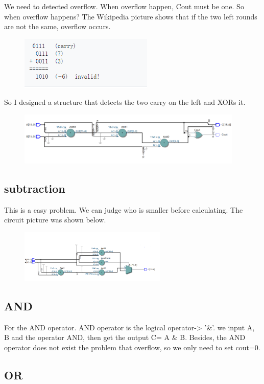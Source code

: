 \documentclass[12pt,a4paper]{article}
\begin{document}
We need to detected overflow.
When overflow happen, Cout must be one.
So when overflow happens?
The Wikipedia picture shows that if the two left rounds are not the same, overflow occurs.
\begin{figure}[H]
  \centering
  \includegraphics[height=1in]{2.PNG}
  \end{figure}
So I designed a structure that detects the two carry on the left and XORs it.
\begin{figure}[H]
  \centering
  \includegraphics[height=1in]{3.PNG}
  \end{figure}

\subsection{subtraction}

This is a easy problem.
We can judge who is smaller before calculating.
The circuit picture was shown below.
\begin{figure}[H]
  \centering
  \includegraphics[height=1in]{sub.PNG}
  \end{figure}

\subsection{AND}

For the AND operator.
AND operator is the logical operator-> '\&'.
we input A, B and the operator AND, then get the output C= A \& B. Besides, the AND operator does not exist the problem that overflow, so we only need to set cout=0.

\subsection{OR}
\end{document}
